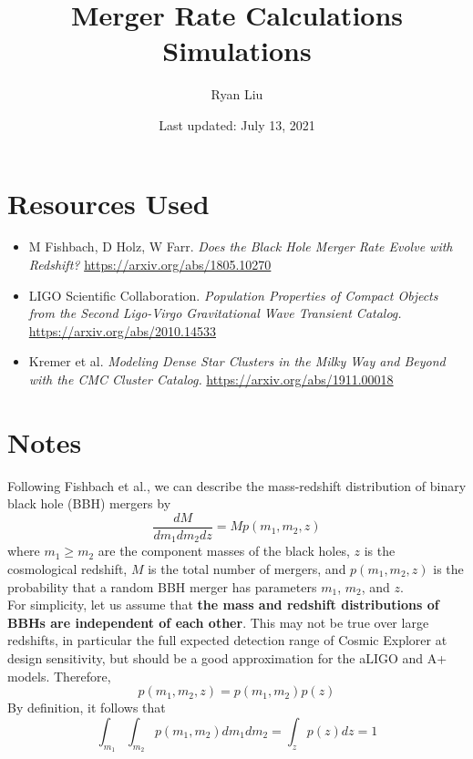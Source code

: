 \documentclass{article}
\title{Merger Rate Calculations Simulations}
\author{Ryan Liu}
\date{Last updated: July 13, 2021}
\begin{document}
\maketitle

\section{Resources Used}

\begin{itemize}
    \item M Fishbach, D Holz, W Farr. \textit{Does the Black Hole Merger Rate Evolve with Redshift?} \url{https://arxiv.org/abs/1805.10270}
    \item LIGO Scientific Collaboration. \textit{Population Properties of Compact Objects from the Second Ligo-Virgo Gravitational Wave Transient Catalog.} \url{https://arxiv.org/abs/2010.14533}
    \item Kremer et al. \textit{Modeling Dense Star Clusters in the Milky Way and Beyond with the CMC Cluster Catalog.} \url{https://arxiv.org/abs/1911.00018}
\end{itemize}



\section{Notes}

Following Fishbach et al., we can describe the mass-redshift distribution of binary black hole (BBH) mergers by 
\begin{equation}
    \frac{dM}{dm_1 dm_2 dz} = M p(m_1, m_2, z)
\end{equation}
where $m_1 \geq m_2$ are the component masses of the black holes, $z$ is the cosmological redshift, $M$ is the total number of mergers, and $p(m_1, m_2, z)$ is the probability that a random BBH merger has parameters $m_1$, $m_2$, and $z$. \\

For simplicity, let us assume that \textbf{the mass and redshift distributions of BBHs are independent of each other}. This may not be true over large redshifts, in particular the full expected detection range of Cosmic Explorer at design sensitivity, but should be a good approximation for the aLIGO and A+ models. Therefore, 
\begin{equation}
    p(m_1, m_2, z) = p(m_1, m_2) p(z)
\end{equation}
By definition, it follows that 
\begin{equation}
    \int_{m_1} \int_{m_2} p(m_1, m_2) dm_1 dm_2 = \int_z p(z) dz = 1
\end{equation}
\end{document}
